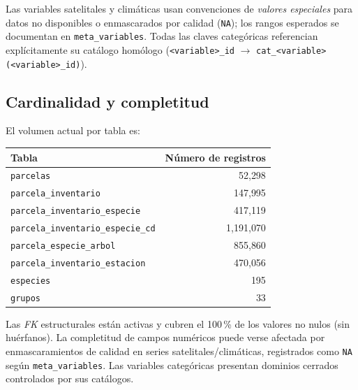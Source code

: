 Las variables satelitales y climáticas usan convenciones de \emph{valores especiales} para datos no disponibles o enmascarados por calidad (\texttt{NA}); los rangos esperados se documentan en \texttt{meta\_variables}. Todas las claves categóricas referencian explícitamente su catálogo homólogo (\texttt{<variable>\_id} $\rightarrow$ \texttt{cat\_<variable>(<variable>\_id)}).

\subsection*{Cardinalidad y completitud}

El volumen actual por tabla es:
\begin{center}
\begin{tabular}{l r}
\toprule
\textbf{Tabla} & \textbf{Número de registros} \\
\midrule
\texttt{parcelas} & 52{,}298 \\
\texttt{parcela\_inventario} & 147{,}995 \\
\texttt{parcela\_inventario\_especie} & 417{,}119 \\
\texttt{parcela\_inventario\_especie\_cd} & 1{,}191{,}070 \\
\texttt{parcela\_especie\_arbol} & 855{,}860 \\
\texttt{parcela\_inventario\_estacion} & 470{,}056 \\
\texttt{especies} & 195 \\
\texttt{grupos} & 33 \\
\bottomrule
\end{tabular}
\end{center}

Las \textit{FK} estructurales están activas y cubren el 100\,\% de los valores no nulos (sin huérfanos). La completitud de campos numéricos puede verse afectada por enmascaramientos de calidad en series satelitales/climáticas, registrados como \texttt{NA} según \texttt{meta\_variables}. Las variables categóricas presentan dominios cerrados controlados por sus catálogos.


